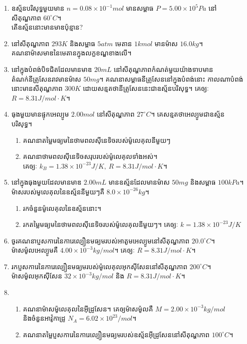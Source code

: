 \begin{enumerate}[m]
	\item ឧស្ម័នបរិសុទ្ធមួយមាន $n=0.08\times10^{-1}mol$ មានសម្ពាធ $P=5.00\times10^{5}Pa$ នៅសីតុណ្ហភាព $60^\circ C$។\\ តើឧស្ម័ននោះមានមាឌប៉ុន្មាន?
	\item នៅសីតុណ្ហភាព $293K$ និងសម្ពាធ $5atm$ មេតាន $1kmol$ មានម៉ាស $16.0kg$។ \\គណនាម៉ាសមាឌនៃមេតានក្នុងលក្ខខណ្ឌខាងលើ។
	\item នៅក្នុងបំពង់បិទជិតដែលមានមាឌ $20mL$ នៅសីតុណ្ហភាពកំណត់មួយយ៉ាងទាបមានតំណក់នីត្រូសែនរាវមានម៉ាស $50mg$។ គណនាសម្ពាធនីត្រូសែននៅក្នុងបំពង់នោះ កាលណាបំពង់នោះមានសីតុណ្ហភាព $300K$ ដោយសន្មតថានីត្រូសែននេះជាឧស្ម័នបរិសុទ្ធ។ គេឲ្យៈ $R=8.31J/mol\cdot K$។
	\item ធុងមួយមានផ្ទុកអេល្យូម $2.00mol$ នៅសីតុណ្ហភាព $27^\circ C$។ គេសន្មតថាអេល្យូមជាឧស្ម័នបរិសុទ្ធ។
	\begin{enumerate}[k]
		\item គណនាតម្លៃមធ្យមនៃថាមពលសុីនេទិចរបស់ម៉ូលេគុលនីមួយៗ
		\item គណនាថាមពលសុីនេទិចសរុបរបស់ម៉ូលេគុលទាំងអស់។\\
		គេឲ្យៈ $k_{B}=1.38\times10^{-23}J/K,~R=8.31J/mol\cdot K$។
	\end{enumerate}
	\item នៅក្នុងធុងមួយដែលមានមាឌ $2.00mL$ មានឧស្ម័នដែលមានម៉ាស $50mg$ និងសម្ពាធ $100kPa$។\\ ម៉ាសរបស់មូលេគុលនៃឧស្ម័ននីមួយៗគឺ $8.0\times10^{-26}kg$។
	\begin{enumerate}[k]
		\item រកចំនួនម៉ូលេគុលនៃឧស្ម័ននោះ។
		\item រកតម្លៃមធ្យមនៃថាមពលសុីនេទិចរបស់ម៉ូលេគុលនីមួយៗ។ គេឲ្យៈ $k=1.38\times10^{-23}J/K$
	\end{enumerate}
	\item ចូរគណនាប្ញសការេនៃការេល្បឿនមធ្យមរបស់អាតូមអេល្យូមនៅសីតុណ្ហភាព $20.0^\circ C$។ \\ម៉ាសម៉ូលអេល្យូមគឺ $4.00\times10^{-3}kg/mol$។ គេឲ្យៈ $R=8.31J/mol\cdot K$។
	\item រកប្ញសការេនៃការេល្បឿនមធ្យមរបស់ម៉ូលេគុលអុកសុីសែននៅសីតុណ្ហភាព $200^\circ C$។ \\ម៉ាសម៉ូលអុកសុីសែន $32\times10^{-3}kg/mol$ និង $R=8.31J/mol\cdot K$។
	\item \begin{enumerate}[k]
		\item គណនាម៉ាសម៉ូលេគុលនៃអុីដ្រូសែន។ គេឲ្យម៉ាសម៉ូលគឺ $M=2.00\times10^{-3}kg/mol$ \\និងចំនួនអាវ៉ូកាដ្រូ $N_{A}=6.02\times10^{23}/mol$។
		\item គណនាតម្លៃប្ញសការេនៃការេល្បឿនមធ្យមរបស់ឧស្ម័នអុីដ្រូសែននៅសីតុណ្ហភាព $100^\circ C$។

\end{enumerate}
\end{enumerate}
